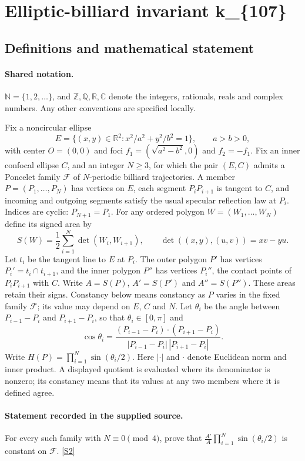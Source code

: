 \documentclass[11pt]{article}
\newcommand{\sref}[2]{\hyperlink{source:#1:#2}{[S#2]}}
\begin{document}
\section{Elliptic-billiard invariant k\_\{107\}}\label{statement}

\subsection{Definitions and mathematical statement}

\paragraph{Shared notation.}$\mathbb N=\{1,2,\ldots\}$, and $\mathbb Z,\mathbb Q,\mathbb R,\mathbb C$ denote the integers, rationals, reals and complex numbers. Any other conventions are specified locally.


Fix a noncircular ellipse
\[
E=\{(x,y)\in\mathbb R^2:x^2/a^2+y^2/b^2=1\},\qquad a>b>0,
\]
with center $O=(0,0)$ and foci $f_1=(\sqrt{a^2-b^2},0)$ and $f_2=-f_1$. Fix an inner confocal ellipse $C$, and an integer $N\geq3$, for which the pair $(E,C)$ admits a Poncelet family $\mathcal F$ of $N$-periodic billiard trajectories. A member $P=(P_1,\ldots,P_N)$ has vertices on $E$, each segment $P_iP_{i+1}$ is tangent to $C$, and incoming and outgoing segments satisfy the usual specular reflection law at $P_i$. Indices are cyclic: $P_{N+1}=P_1$.
For any ordered polygon $W=(W_1,\ldots,W_N)$ define its signed area by
\[
S(W)=\frac12\sum_{i=1}^N\det(W_i,W_{i+1}),\qquad
\det((x,y),(u,v))=xv-yu.
\]
Let $t_i$ be the tangent line to $E$ at $P_i$. The outer polygon $P'$ has vertices $P_i'=t_i\cap t_{i+1}$, and the inner polygon $P''$ has vertices $P_i''$, the contact points of $P_iP_{i+1}$ with $C$. Write $A=S(P)$, $A'=S(P')$ and $A''=S(P'')$. These areas retain their signs. Constancy below means constancy as $P$ varies in the fixed family $\mathcal F$; its value may depend on $E$, $C$ and $N$.
Let $\theta_i$ be the angle between $P_{i-1}-P_i$ and $P_{i+1}-P_i$, so that $\theta_i\in[0,\pi]$ and
\[
\cos\theta_i=\frac{(P_{i-1}-P_i)\cdot(P_{i+1}-P_i)}{|P_{i-1}-P_i|\,|P_{i+1}-P_i|}.
\]
Write $H(P)=\prod_{i=1}^N\sin(\theta_i/2)$. Here $|\cdot|$ and $\cdot$ denote Euclidean norm and inner product.
A displayed quotient is evaluated where its denominator is nonzero; its constancy means that its values at any two members where it is defined agree.
\paragraph{Statement recorded in the supplied source.}
For every such family with $N\equiv0\pmod4$, prove that $\displaystyle \frac{A'}{A}\prod_{i=1}^N\sin(\theta_i/2)$ is constant on $\mathcal F$. \sref{statement}{2}
\end{document}

